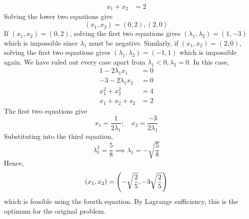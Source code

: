 \begin{example}
\begin{align*}
                x_1 + x_2 &= 2
            \end{align*}
            Solving the lower two equations give
            \[ (x_1, x_2) = (0, 2), (2, 0) \]
            If \((x_1, x_2) = (0, 2)\), solving the first two equations gives \((\lambda_1, \lambda_2) = (1, -3)\) which is impossible since \(\lambda_1\) must be negative.
            Similarly, if \((x_1, x_2) = (2, 0)\), solving the first two equations gives \((\lambda_1, \lambda_2) = (-1, 1)\) which is impossible again.
            We have ruled out every case apart from \(\lambda_1 < 0, \lambda_2 = 0\).
            In this case,
            \begin{align*}
                1 - 2\lambda_1 x_1 &= 0 \\
                -3 - 2\lambda_1 x_2 &= 0 \\
                x_1^2 + x_2^2 &= 4 \\
                x_1 + x_2 + s_2 &= 2
            \end{align*}
            The first two equations give
            \[ x_1 = \frac{1}{2\lambda_1};\quad x_2 = \frac{-3}{2\lambda_1} \]
            Substituting into the third equation,
            \[ \lambda_1^2 = \frac{5}{8} \implies \lambda_1 = -\sqrt{\frac{5}{8}} \]
            Hence,
            \[ (x_1, x_2) = \qty(-\sqrt{\frac{2}{5}}, -3\sqrt{\frac{2}{5}}) \]
            which is feasible using the fourth equation.
            By Lagrange sufficiency, this is the optimum for the original problem.
\end{example}
